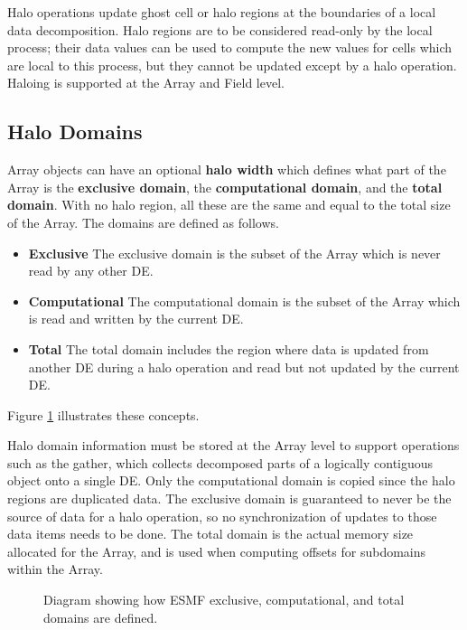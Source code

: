 
\label{sec:halo}
Halo operations update ghost cell or halo regions at the boundaries
of a local data decomposition.  Halo regions are to be considered
read-only by the local process; their data values can be used to
compute the new values for cells which are local to this process,
but they cannot be updated except by a halo operation.  Haloing is
supported at the Array and Field level.  

\subsection{Halo Domains}

Array objects can have an optional {\bf halo width} which defines
what part of the Array is the {\bf exclusive domain}, the {\bf computational
domain}, and the {\bf total domain}.  With no halo region, all these are
the same and equal to the total size of the Array.  The domains are
defined as follows.

\begin{itemize}

\item {\bf Exclusive}  The exclusive domain is the subset of the
Array which is never read by any other DE.  

\item {\bf Computational}  The computational domain
is the subset of the Array which is read and written by the current DE.

\item {\bf Total}  The total domain includes the region where data is 
updated from another DE during a halo operation and read but not 
updated by the current DE.  

\end{itemize}

Figure \ref{fig:halo} illustrates these concepts.

Halo domain information must be stored at the Array level to
support operations such as the gather, which collects
decomposed parts of a logically contiguous object onto a single DE.
Only the computational domain is copied since the halo regions are
duplicated data.  The exclusive domain is guaranteed to never be
the source of data for a halo operation, so no synchronization
of updates to those data items needs to be done.  The total
domain is the actual memory size allocated for the Array,
and is used when computing offsets for subdomains within the Array.

\begin{center}
\begin{figure}
\caption{Diagram showing how ESMF exclusive, computational,
and total domains are defined.  }
\label{fig:halo}
\end{figure}
\end{center}


